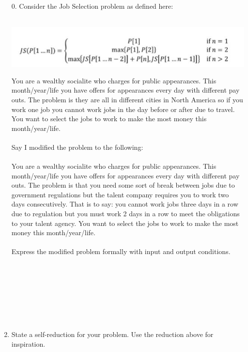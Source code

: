 \documentclass[12pt]{article}
\begin{document}
\begin{enumerate}
    \item[0.] Consider the Job Selection problem as defined here: \\\\
    \centerline{\includegraphics{JS.jpg}} 
    You are a wealthy socialite who charges for public appearances.  This month/year/life you have offers for appearances every day with different pay outs.  The problem is they are all in different cities in North America so if you work one job you cannot work jobs in the day before or after due to travel.  You want to select the jobs to work to make the most money this month/year/life.\\\\
    Say I modified the problem to the following: \\\\
    You are a wealthy socialite who charges for public appearances.  This month/year/life you have offers for appearances every day with different pay outs.  The problem is that you need some sort of break between jobs due to government regulations but the talent company requires you to work two days consecutively. That is to say: you cannot work jobs three days in a row due to regulation but you must work 2 days in a row to meet the obligations to your talent agency.  You want to select the jobs to work to make the most money this month/year/life.\\\\
    Express the modified problem formally with input and output conditions.\\\\\\\\\\\\\\\\
\newpage
    \item State a self-reduction for your problem. Use the reduction above for inspiration.\\\\\\\\\\\\\\\\\\\\

\end{enumerate}
\end{document}
